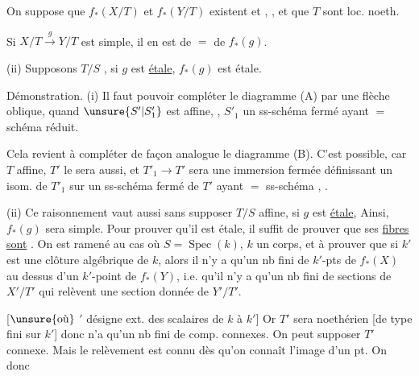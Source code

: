 On suppose que $f_*(X/T)$ et $f_*(Y/T)$ existent et  , , et que  $T$ sont loc. noeth.

Si $X/T\xrightarrow{g}Y/T$ est simple, il en est de $=$ de $f_*(g)$.


(ii) Supposons $T/S$  , si $g$ est \uline{étale}, $f_*(g)$ est étale.

Démonstration. (i) Il faut pouvoir compléter le diagramme (A) par une flèche oblique,  quand $\unsure{S'|S'_1}$ est affine, , $S'_1$ un ss-schéma fermé ayant $=$ schéma réduit.

Cela revient à compléter de façon analogue le diagramme (B). C'est possible, car $T$  affine, $T'$ le sera aussi, et $T'_1\to T'$ sera une immersion fermée définissant un isom. de $T'_1$ sur un ss-schéma fermé de $T'$ ayant $=$ ss-schéma ,  .

(ii) Ce raisonnement vaut aussi sans supposer $T/S$ affine, si $g$ est \uline{étale},  Ainsi, $f_*(g)$ sera simple. Pour prouver qu'il est étale, il suffit de prouver que ses \uline{fibres sont}   .  On est ramené au cas où $S=\operatorname{Spec}(k)$, $k$ un corps, et à prouver que si $k'$ est une clôture algébrique de $k$, alors il n'y a qu'un nb fini de $k'$-pts de $f_*(X)$ au dessus d'un $k'$-point de $f_*(Y)$, i.e. qu'il n'y a qu'un nb fini de sections de $X'/T'$ qui relèvent une section donnée de $Y'/T'$.

[$\unsure{\text{où}}$ $'$ désigne ext. des scalaires de $k$ à $k'$]
Or $T'$ sera noethérien [de type fini sur $k'$] donc n'a qu'un nb fini de comp. connexes. On peut supposer $T'$ connexe. Mais le relèvement est connu dès qu'on connaît l'image d'un pt. On  donc


